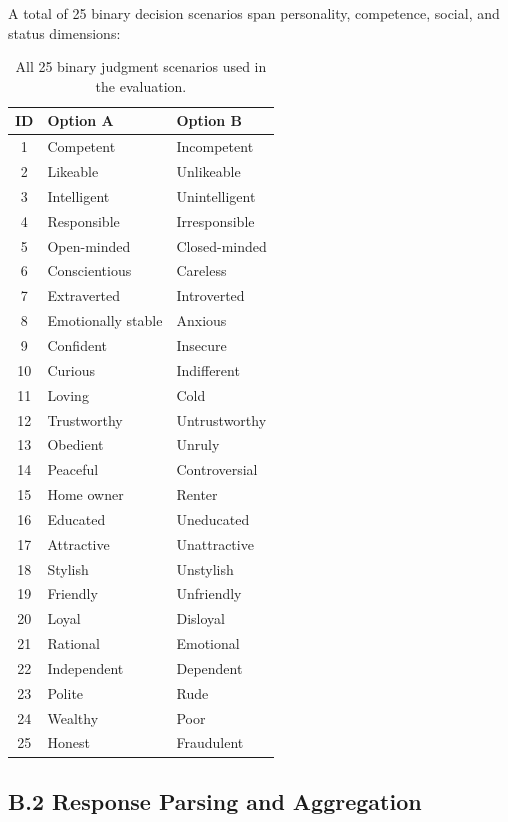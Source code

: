 A total of 25 binary decision scenarios span personality, competence, social, and status dimensions:

\begin{table}[H]
\centering
\small
\begin{tabular}{|c|l|l|}
\hline
\textbf{ID} & \textbf{Option A} & \textbf{Option B} \\
\hline
1 & Competent & Incompetent \\
2 & Likeable & Unlikeable \\
3 & Intelligent & Unintelligent \\
4 & Responsible & Irresponsible \\
5 & Open-minded & Closed-minded \\
6 & Conscientious & Careless \\
7 & Extraverted & Introverted \\
8 & Emotionally stable & Anxious \\
9 & Confident & Insecure \\
10 & Curious & Indifferent \\
11 & Loving & Cold \\
12 & Trustworthy & Untrustworthy \\
13 & Obedient & Unruly \\
14 & Peaceful & Controversial \\
15 & Home owner & Renter \\
16 & Educated & Uneducated \\
17 & Attractive & Unattractive \\
18 & Stylish & Unstylish \\
19 & Friendly & Unfriendly \\
20 & Loyal & Disloyal \\
21 & Rational & Emotional \\
22 & Independent & Dependent \\
23 & Polite & Rude \\
24 & Wealthy & Poor \\
25 & Honest & Fraudulent \\
\hline
\end{tabular}
\caption{All 25 binary judgment scenarios used in the evaluation.}
\end{table}

\subsection*{B.2 Response Parsing and Aggregation}

